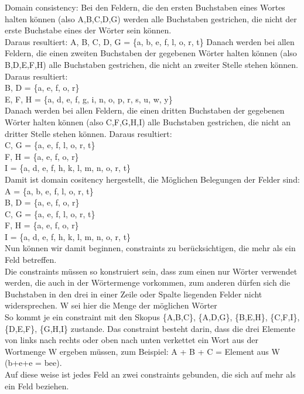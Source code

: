 \documentclass[a4paper,10pt]{article}
\begin{document}
Domain consistency: Bei den Feldern, die den ersten Buchstaben eines Wortes halten können (also A,B,C,D,G) werden alle Buchstaben gestrichen,
die nicht der erste Buchstabe eines der Wörter sein können.\\
Daraus resultiert: 
A, B, C, D, G = \{a, b, e, f, l, o, r, t\}
Danach werden bei allen Feldern, die einen zweiten Buchstaben der gegebenen Wörter halten können (also B,D,E,F,H) alle Buchstaben gestrichen, die nicht an zweiter 
Stelle stehen können.
Daraus resultiert: \\
B, D = \{a, e, f, o, r\}\\
E, F, H = \{a, d, e, f, g, i, n, o, p, r, s, u, w, y\}\\
Danach werden bei allen Feldern, die einen dritten Buchstaben der gegebenen Wörter halten können (also C,F,G,H,I) alle Buchstaben gestrichen, die nicht an dritter 
Stelle stehen können.
Daraus resultiert:\\
C, G = \{a, e, f, l, o, r, t\}\\
F, H = \{a, e, f, o, r\}\\
I =    \{a, d, e, f, h, k, l, m, n, o, r, t\}\\
Damit ist domain cositency hergestellt, die Möglichen Belegungen der Felder sind:\\
A = \{a, b, e, f, l, o, r, t\}\\
B, D = \{a, e, f, o, r\}\\
C, G = \{a, e, f, l, o, r, t\}\\
F, H = \{a, e, f, o, r\}\\
I    = \{a, d, e, f, h, k, l, m, n, o, r, t\}\\
Nun können wir damit beginnen, constraints zu berücksichtigen, die mehr als ein Feld betreffen.\\
Die constraints müssen so konstruiert sein, dass zum einen nur Wörter verwendet werden, die auch in der Wörtermenge vorkommen, 
zum anderen dürfen sich die Buchstaben in den drei in einer Zeile oder Spalte liegenden Felder nicht 
widersprechen. W sei hier die Menge der möglichen Wörter\\
So kommt je ein constraint mit den Skopus \{A,B,C\}, \{A,D,G\}, \{B,E,H\}, \{C,F,I\}, \{D,E,F\}, \{G,H,I\} zustande.
Das constraint besteht darin, dass die drei Elemente von links nach rechts oder oben nach unten verkettet ein Wort aus der Wortmenge 
W ergeben müssen, zum Beispiel: A + B + C = Element aus W (b+e+e = bee).\\
Auf diese weise ist jedes Feld an zwei constraints gebunden, die sich auf mehr als ein Feld beziehen.
\end{document}
